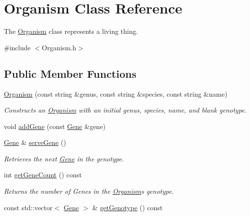 \hypertarget{class_organism}{}\section{Organism Class Reference}
\label{class_organism}


The \hyperlink{class_organism}{Organism} class represents a living thing.  




{\ttfamily \#include $<$Organism.\+h$>$}

\subsection*{Public Member Functions}
\begin{DoxyCompactItemize}
\item 
\hyperlink{class_organism_a4e5d98843608364964a6616e630f9c3b}{Organism} (const string \&genus, const string \&species, const string \&name)
\begin{DoxyCompactList}\small\item\em Constructs an \hyperlink{class_organism}{Organism} with an initial genus, species, name, and blank genotype. \end{DoxyCompactList}\item 
void \hyperlink{class_organism_a3dd60a8f90366cd02ba10e32bc2aae3c}{add\+Gene} (const \hyperlink{class_gene}{Gene} \&gene)
\item 
\hyperlink{class_gene}{Gene} \& \hyperlink{class_organism_a8b587d97ced82e377dc7bc9e5c5613fe}{serve\+Gene} ()
\begin{DoxyCompactList}\small\item\em Retrieves the next \hyperlink{class_gene}{Gene} in the genotype. \end{DoxyCompactList}\item 
int \hyperlink{class_organism_a9719a5a125a051c2fadffe6f4d9a8bb8}{get\+Gene\+Count} () const \hypertarget{class_organism_a9719a5a125a051c2fadffe6f4d9a8bb8}{}\label{class_organism_a9719a5a125a051c2fadffe6f4d9a8bb8}

\begin{DoxyCompactList}\small\item\em Returns the number of Genes in the \hyperlink{class_organism}{Organism}\textquotesingle{}s genotype. \end{DoxyCompactList}\item 
const std\+::vector$<$ \hyperlink{class_gene}{Gene} $>$ \& \hyperlink{class_organism_a1744d697440baff0a30a9eded7322f2a}{get\+Genotype} () const \hypertarget{class_organism_a1744d697440baff0a30a9eded7322f2a}{}\label{class_organism_a1744d697440baff0a30a9eded7322f2a}


\end{DoxyCompactItemize}
